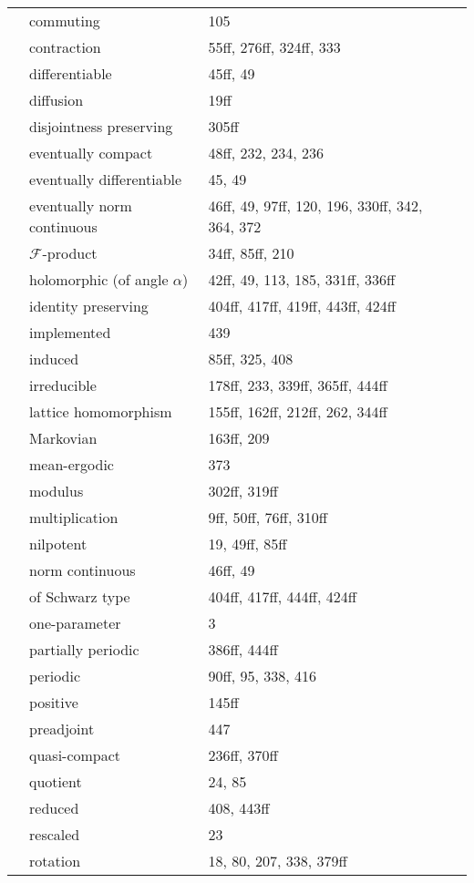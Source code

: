 \documentclass[10pt]{scrartcl}
\begin{document}
\begin{longtable}{>{\bfseries}p{5cm}p{4cm}p{4cm}p{4cm}}
	& commuting 	& 105 \\
	& contraction 	& 55ff, 276ff, 324ff, 333 \\
	& differentiable 	& 45ff, 49 \\
	& diffusion 	& 19ff \\
	& disjointness preserving 	& 305ff \\
	& eventually compact 	& 48ff, 232, 234, 236 \\
	& eventually differentiable 	& 45, 49 \\
	& eventually norm continuous 	& 46ff, 49, 97ff, 120, 196, 330ff, 342, 364, 372 \\
	& $\mathcal{F}$-product 	& 34ff, 85ff, 210 \\
	& holomorphic (of angle $\alpha$) 	& 42ff, 49, 113, 185, 331ff, 336ff \\
	& identity preserving 	& 404ff, 417ff, 419ff, 443ff, 424ff \\
	& implemented 	& 439 \\
	& induced 	& 85ff, 325, 408 \\
	& irreducible 	& 178ff, 233, 339ff, 365ff, 444ff \\
	& lattice homomorphism 	& 155ff, 162ff, 212ff, 262, 344ff \\
	& Markovian 	& 163ff, 209 \\
	& mean-ergodic 	& 373 \\
	& modulus 	& 302ff, 319ff \\
	& multiplication 	& 9ff, 50ff, 76ff, 310ff \\
	& nilpotent 	& 19, 49ff, 85ff \\
	& norm continuous 	& 46ff, 49 \\
	& of Schwarz type 	& 404ff, 417ff, 444ff, 424ff \\
	& one-parameter 	& 3 \\
	& partially periodic 	& 386ff, 444ff \\
	& periodic 	& 90ff, 95, 338, 416 \\
	& positive 	& 145ff \\
	& preadjoint 	& 447 \\
	& quasi-compact 	& 236ff, 370ff \\
	& quotient 	& 24, 85 \\
	& reduced 	& 408, 443ff \\
	& rescaled 	& 23 \\
	& rotation 	& 18, 80, 207, 338, 379ff \\

\end{longtable}
\end{document}
